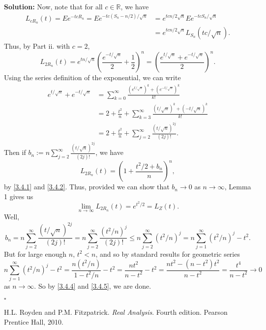 \documentclass[12pt]{article}
\newcounter{ProofCounter}
\newenvironment{Solution}{\stepcounter{ProofCounter}\textbf{Solution:}}{\hfill$\square$}
\begin{document}
\begin{Solution}
  Now, note that for all $c \in \mathbb{R}$, we have
  \begin{align*}
    L_{cR_n}(t) = Ee^{-tcR_n} = Ee^{-tc(S_n - n/2) / \sqrt{n}} & = e^{tcn / 2\sqrt{n}} Ee^{-tcS_n / \sqrt{n}} \\
    & = e^{tcn / 2\sqrt{n}} L_{S_n}(tc / \sqrt{n}).
  \end{align*}
  Thus, by Part ii. with $c = 2$,
  \begin{equation}
    L_{2R_n}(t) = e^{tn/\sqrt{n}} \left( \frac{e^{-t/\sqrt{n}}}{2} + \frac{1}{2} \right)^{n} = \left( \frac{e^{t/\sqrt{n}} + e^{-t/\sqrt{n}}}{2} \right)^{n}.
    \label{3.4.1}
  \end{equation}
  Using the series definition of the exponential, we can write
  \begin{align}
    e^{t/\sqrt{n}} + e^{-t/\sqrt{n}} & = \sum_{k=0}^{\infty} \frac{(e^{t/\sqrt{n}})^k + (e^{-t/\sqrt{n}})^k}{k!} \nonumber \\
    & = 2 + \frac{t^2}{n} + \sum_{k=3}^{\infty} \frac{(t/\sqrt{n})^k + (-t/\sqrt{n})^k}{k!} \nonumber \\
    & = 2 + \frac{t^2}{n} + \sum_{j=2}^{\infty} \frac{(t/\sqrt{n})^{2j}}{(2j)!}.
    \label{3.4.2}
  \end{align}
  Then if $b_n := n\sum_{j=2}^{\infty} \frac{(t/\sqrt{n})^{2j}}{(2j)!}$, we have
  \begin{equation}
    L_{2R_n}(t) = \left( 1 + \frac{t^2 / 2 + b_n}{n} \right)^{n},
    \label{3.4.3}
  \end{equation}
  by \eqref{3.4.1} and \eqref{3.4.2}. Thus, provided we can show that $b_n \rightarrow 0$ as $n \rightarrow \infty$, Lemma 1 gives us
  \[
    \lim_{n\rightarrow\infty} L_{2R_n}(t) = e^{t^2/2} = L_{Z}(t).
  \]
  Well,
  \begin{equation}
    b_n = n\sum_{j=2}^{\infty} \frac{(t/\sqrt{n})^{2j}}{(2j)!} = n\sum_{j=2}^{\infty} \frac{(t^2 / n)^j}{(2j)!} \leq n\sum_{j=2}^{\infty} (t^2 / n)^j = n\sum_{j=1}^{\infty}(t^2 / n)^j - t^2.
    \label{3.4.4}
  \end{equation}
  But for large enough $n$, $t^2 < n$, and so by standard results for geometric series
  \begin{equation}
    n\sum_{j=1}^{\infty}(t^2 / n)^j - t^2 = \frac{n(t^2/n)}{1 - t^2/n} - t^2 = \frac{nt^2}{n - t^2} - t^2 = \frac{nt^2 - (n-t^2)t^2}{n-t^2} = \frac{t^4}{n-t^2} \rightarrow 0
    \label{3.4.5}
  \end{equation}
  as $n \rightarrow \infty$. So by \eqref{3.4.4} and \eqref{3.4.5}, we are done.

\end{Solution}


\begin{thebibliography}{9}
    H.L. Royden and P.M. Fitzpatrick.
    \textit{Real Analysis}. Fourth edition.
    Pearson Prentice Hall, 2010.
\end{thebibliography}
\end{document}
